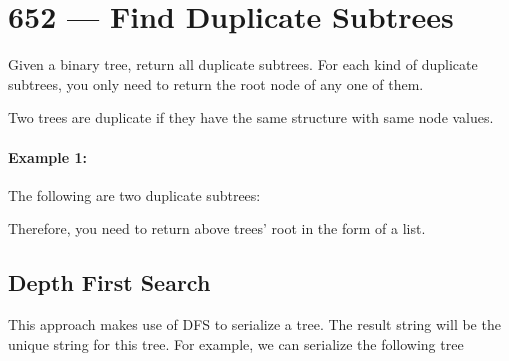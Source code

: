 \section{652 --- Find Duplicate Subtrees}
Given a binary tree, return all duplicate subtrees. For each kind of duplicate subtrees, you only need to return the root node of any one of them.

Two trees are duplicate if they have the same structure with same node values.

\paragraph{Example 1:}

\begin{flushleft}
\begin{figure}[H]
\end{figure}

The following are two duplicate subtrees:

\begin{figure}[H]
\end{figure}

\begin{figure}[H]
\end{figure}

Therefore, you need to return above trees' root in the form of a list.
\end{flushleft}

\subsection{Depth First Search}
This approach makes use of DFS to serialize a tree. The result string will be the unique string for this tree. For example, we can serialize the following tree 


